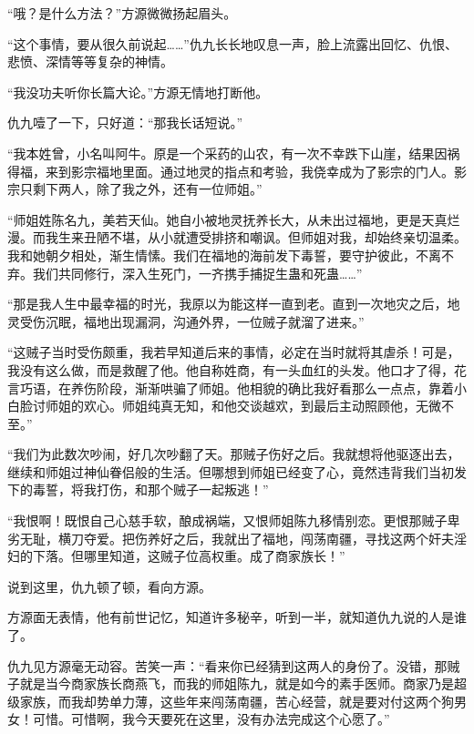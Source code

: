 
\begin{this_body}



“哦？是什么方法？”方源微微扬起眉头。

“这个事情，要从很久前说起……”仇九长长地叹息一声，脸上流露出回忆、仇恨、悲愤、深情等等复杂的神情。

“我没功夫听你长篇大论。”方源无情地打断他。

仇九噎了一下，只好道：“那我长话短说。”

“我本姓曾，小名叫阿牛。原是一个采药的山农，有一次不幸跌下山崖，结果因祸得福，来到影宗福地里面。通过地灵的指点和考验，我侥幸成为了影宗的门人。影宗只剩下两人，除了我之外，还有一位师姐。”

“师姐姓陈名九，美若天仙。她自小被地灵抚养长大，从未出过福地，更是天真烂漫。而我生来丑陋不堪，从小就遭受排挤和嘲讽。但师姐对我，却始终亲切温柔。我和她朝夕相处，渐生情愫。我们在福地的海前发下毒誓，要守护彼此，不离不弃。我们共同修行，深入生死门，一齐携手捕捉生蛊和死蛊……”

“那是我人生中最幸福的时光，我原以为能这样一直到老。直到一次地灾之后，地灵受伤沉眠，福地出现漏洞，沟通外界，一位贼子就溜了进来。”

“这贼子当时受伤颇重，我若早知道后来的事情，必定在当时就将其虐杀！可是，我没有这么做，而是救醒了他。他自称姓商，有一头血红的头发。他口才了得，花言巧语，在养伤阶段，渐渐哄骗了师姐。他相貌的确比我好看那么一点点，靠着小白脸讨师姐的欢心。师姐纯真无知，和他交谈越欢，到最后主动照顾他，无微不至。”

“我们为此数次吵闹，好几次吵翻了天。那贼子伤好之后。我就想将他驱逐出去，继续和师姐过神仙眷侣般的生活。但哪想到师姐已经变了心，竟然违背我们当初发下的毒誓，将我打伤，和那个贼子一起叛逃！”

“我恨啊！既恨自己心慈手软，酿成祸端，又恨师姐陈九移情别恋。更恨那贼子卑劣无耻，横刀夺爱。把伤养好之后，我就出了福地，闯荡南疆，寻找这两个奸夫淫妇的下落。但哪里知道，这贼子位高权重。成了商家族长！”

说到这里，仇九顿了顿，看向方源。

方源面无表情，他有前世记忆，知道许多秘辛，听到一半，就知道仇九说的人是谁了。

仇九见方源毫无动容。苦笑一声：“看来你已经猜到这两人的身份了。没错，那贼子就是当今商家族长商燕飞，而我的师姐陈九，就是如今的素手医师。商家乃是超级家族，而我却势单力薄，这些年来闯荡南疆，苦心经营，就是要对付这两个狗男女！可惜。可惜啊，我今天要死在这里，没有办法完成这个心愿了。”


\end{this_body}
